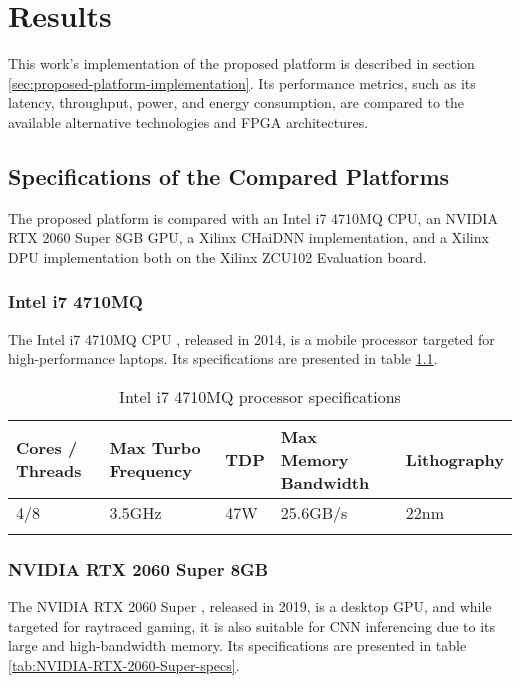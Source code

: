 \chapter{Results}
This work's implementation of the proposed platform is described in section \ref{sec:proposed-platform-implementation}. Its performance metrics, such as its latency, throughput, power, and energy consumption, are compared to the available alternative technologies and FPGA architectures.

\section{Specifications of the Compared Platforms}
The proposed platform is compared with an Intel i7 4710MQ CPU, an NVIDIA RTX 2060 Super 8GB GPU, a Xilinx CHaiDNN implementation, and a Xilinx DPU implementation both on the Xilinx ZCU102 Evaluation board.

\subsection{Intel i7 4710MQ}
The Intel i7 4710MQ CPU \cite{Intel-i7-4710MQ-Processor}, released in 2014, is a mobile processor targeted for high-performance laptops. Its specifications are presented in table \ref{tab:Intel-i7-4710MQ-specs}.

\begin{table}[H]
	\caption{Intel i7 4710MQ processor specifications}
	\label{tab:Intel-i7-4710MQ-specs}
	\centering
	\begin{tabular}{p{2cm} p{3cm} p{1cm} p{3cm} p{3cm}}
		\toprule
		\textbf{Cores / Threads} & \textbf{Max Turbo Frequency} & \textbf{TDP} & \textbf{Max Memory Bandwidth} & \textbf{Lithography}\\
		\midrule
			4/8 & 3.5GHz & 47W & 25.6GB/s & 22nm\\
		\bottomrule\\
	\end{tabular}
\end{table}

\subsection{NVIDIA RTX 2060 Super 8GB}
The NVIDIA RTX 2060 Super \cite{NVIDIA-RTX-2060-Super}, released in 2019, is a desktop GPU, and while targeted for raytraced gaming, it is also suitable for CNN inferencing due to its large and high-bandwidth memory. Its specifications are presented in table \ref{tab:NVIDIA-RTX-2060-Super-specs}.


